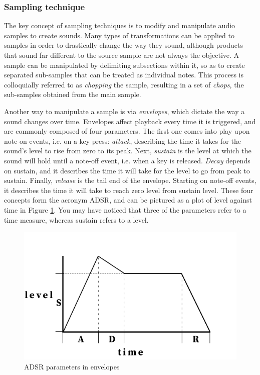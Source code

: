 \documentclass[12pt, a4paper, hidelinks]{article}
\begin{document}
	\subsubsection{Sampling technique} \label{st}
	The key concept of sampling techniques is to modify and manipulate audio samples to create sounds. Many types of transformations can be applied to samples in order to drastically change the way they sound, although products that sound far different to the source sample are not always the objective. A sample can be manipulated by delimiting subsections within it, so as to create separated sub-samples that can be treated as individual notes. This process is colloquially referred to as \textit{chopping} the sample, resulting in a set of \textit{chops}, the sub-samples obtained from the main sample. \par
	Another way to manipulate a sample is via \textit{envelopes}, which dictate the way a sound changes over time. Envelopes affect playback every time it is triggered, and are commonly composed of four parameters. The first one  comes into play upon note-on events, i.e. on a key press: \textit{attack}, describing the time it takes for the sound's level to rise from zero to its peak. Next, \textit{sustain} is the level at which the sound will hold until a note-off event, i.e. when a key is released. \textit{Decay} depends on sustain, and it describes the time it will take for the level to go from peak to sustain. Finally, \textit{release} is the tail end of the envelope. Starting on note-off events, it describes the time it will take to reach zero level from sustain level. These four concepts form the acronym ADSR, and can be pictured as a plot of level against time in Figure \ref{fig:envelope}. You may have noticed that three of the parameters refer to a time measure, whereas sustain refers to a level. \par
	
	
	\begin{figure}[h]
		\centering
		\includegraphics[scale=0.4]{envelope.png}
		\caption{ADSR parameters in envelopes}
		\label{fig:envelope}
	\end{figure}
	
\end{document}
